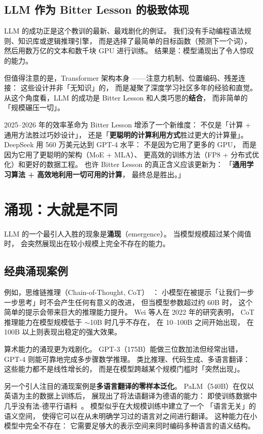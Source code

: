 \subsection{LLM 作为 Bitter Lesson 的极致体现}

LLM 的成功正是这个教训的最新、最戏剧化的例证。
我们没有手动编程语法规则、知识库或逻辑推理引擎，
而是选择了最简单的目标函数（预测下一个词），
然后用数万亿的文本和数千块 GPU 进行训练。
结果是：模型涌现出了令人惊叹的能力。

但值得注意的是，Transformer 架构本身
——注意力机制、位置编码、残差连接：
这些设计并非「无知识」的，
而是凝聚了深度学习社区多年的经验和直觉。
从这个角度看，LLM 的成功是
Bitter Lesson 和人类巧思的\textbf{结合}，
而非简单的「规模碾压一切」。

2025--2026 年的效率革命为 Bitter Lesson 增添了一个新维度：
不仅是「计算 + 通用方法胜过巧妙设计」，
还是「\textbf{更聪明的计算利用方式}胜过更大的计算量」。
DeepSeek 用 560 万美元达到 GPT-4 水平：
不是因为它用了更多的 GPU，
而是因为它用了更聪明的架构（MoE + MLA）、
更高效的训练方法（FP8 + 分布式优化）和更好的数据工程。
也许 Bitter Lesson 的真正含义应该更新为：
「\textbf{通用学习算法 + 高效地利用一切可用的计算}，
最终总是胜出。」

\section{涌现：大就是不同}

LLM 的一个最引人入胜的现象是\textbf{涌现}（emergence）。
当模型规模超过某个阈值时，
会突然展现出在较小规模上完全不存在的能力。

\subsection{经典涌现案例}

例如，思维链推理（Chain-of-Thought, CoT）~\cite{wei2022cot}：
小模型在被提示「让我们一步一步思考」时不会产生任何有意义的改进，
但当模型参数超过约 60B 时，
这个简单的提示会带来巨大的推理能力提升。
Wei 等人在 2022 年的研究表明，
CoT 推理能力在模型规模低于 $\sim$10B 时几乎不存在，
在 10--100B 之间开始出现，
在 100B 以上则表现出稳定的强大效果。

算术能力的涌现更为戏剧化。
GPT-3（175B）能做三位数加法但经常出错，
GPT-4 则能可靠地完成多步骤数学推理。
类比推理、代码生成、多语言翻译：
这些能力都不是线性增长的，
而是在模型跨越某个规模门槛时「突然出现」。

另一个引人注目的涌现案例是\textbf{多语言翻译的零样本泛化}。
PaLM（540B）在仅以英语为主的数据上训练后，
展现出了将法语翻译为德语的能力：
即使训练数据中几乎没有法-德平行语料~\cite{chowdhery2022palm}。
模型似乎在大规模训练中建立了一个
「语言无关」的语义空间，
使得它可以在从未明确学习过的语言对之间进行翻译。
这种能力在小模型中完全不存在：
它需要足够大的表示空间来同时编码多种语言的语义结构。

